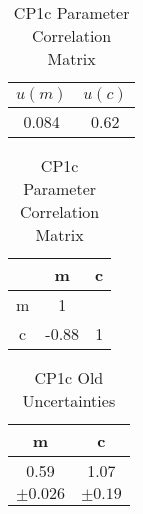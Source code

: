 \documentclass[12pt]{article}
\begin{document}
    \begin{table}[H]
        \begin{minipage}{0.5\textwidth}
            \centering
            \begin{tabular}{c c}
                \hline
                $u(m)$ & $u(c)$ \\
                \hline
                0.084 & 0.62 \\
                \hline
            \end{tabular}
            \caption{CP1c Unweighted Uncertainties of Parameters}
            \label{table:CP1c Unweighted Param Uncertainties}
        \end{minipage}
        \vspace{12pt}
        \begin{minipage}{0.5\textwidth}
            \centering
            \begin{tabular}{c c c}
                \hline
                & m & c \\
                \hline
                m & 1 \\
                c & -0.88 & 1 \\
                \hline
            \end{tabular}
            \caption{CP1c Parameter Correlation Matrix}
            \label{table:CP1c Correlation Matrix}
        \end{minipage}
    \end{table}

    \begin{table}[H]
        \centering
        \begin{tabular}{cc}
            \hline
            m & c \\
            \hline
            0.59 & 1.07 \\
            $\pm0.026$ & $\pm0.19$ \\
            \hline
        \end{tabular}
        \caption{CP1c Old Uncertainties}
        \label{table:CP1c Old Uncertainties}
    \end{table}
\end{document}
